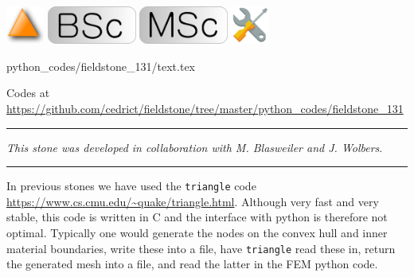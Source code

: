 \includegraphics[height=1.25cm]{images/pictograms/triangle}
\includegraphics[height=1.25cm]{images/pictograms/bsc}
\includegraphics[height=1.25cm]{images/pictograms/msc}
\includegraphics[height=1.25cm]{images/pictograms/tools}



\begin{flushright} {\tiny {\color{gray} python\_codes/fieldstone\_131/text.tex}} \end{flushright}

%

\begin{center}

Codes at \url{https://github.com/cedrict/fieldstone/tree/master/python_codes/fieldstone_131}
\end{center}

\par\noindent\rule{\textwidth}{0.4pt}

{\sl This stone was developed in collaboration with M. Blasweiler and J. Wolbers}. 

\par\noindent\rule{\textwidth}{0.4pt}

In previous stones we have used the {\tt triangle} code \url{https://www.cs.cmu.edu/~quake/triangle.html}.
Although very fast and very stable, this code is written in C and the interface with python 
is therefore not optimal. Typically one would generate the nodes on the convex hull and inner 
material boundaries, write these into a file, have {\tt triangle} read these in, return the 
generated mesh into a file, and read the latter in the FEM python code. 

